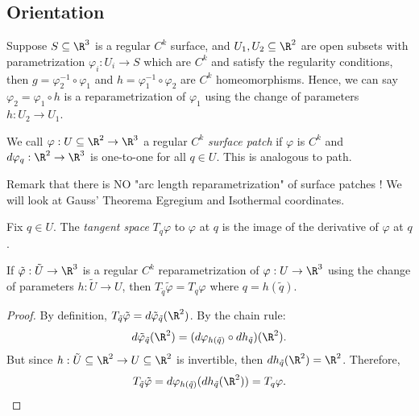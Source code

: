 \subsection{Orientation}

\begin{proposition}
    Suppose $S \subseteq \R^3$ is a regular $C^k$ surface, and $U_1, U_2 \subseteq \R^2$ are open subsets with parametrization $\varphi_i : U_i \to S$ which are $C^k$ and satisfy the regularity conditions, then $g = \varphi_2^{-1} \circ \varphi_1$ and $h = \varphi_1^{-1} \circ \varphi_2$ are $C^k$ homeomorphisms. Hence, we can say $\varphi_2 = \varphi_1 \circ h$ is a reparametrization of $\varphi_1$ using the change of parameters $h : U_2 \to U_1$.
\end{proposition}

\begin{definition}
    We call $\varphi : U \subseteq \R^2 \to \R^3$ a regular $C^k$ \textit{surface patch} if $\varphi$ is $C^k$ and $d\varphi_q : \R^2 \to \R^3$ is one-to-one for all $q \in U$. This is analogous to path.
\end{definition}

Remark that there is NO "arc length reparametrization" of surface patches ! We will look at Gauss' Theorema Egregium and Isothermal coordinates.

\begin{definition}
    Fix $q \in U$. The \textit{tangent space} $T_q\varphi$ to $\varphi$ at $q$ is the image of the derivative of $\varphi$ at $q$.
\end{definition}

\begin{proposition}
    If $\tilde{\varphi} : \tilde{U} \to \R^3$ is a regular $C^k$ reparametrization of $\varphi : U \to \R^3$ using the change of parameters $h : \tilde{U} \to U$, then $T_{\tilde{q}}\tilde{\varphi} = T_q \varphi$ where $q = h(\tilde{q})$.
\end{proposition}

\begin{proof}
    By definition, $T_{\tilde{q}}\tilde{\varphi} = d \tilde{\varphi}_{\tilde{q}}(\R^2)$. By the chain rule:
    $$d \tilde{\varphi}_{\tilde{q}}(\R^2) = (d \varphi_{h(\tilde{q})} \circ d h_{\tilde{q}})(\R^2).$$
    But since $h: \tilde{U} \subseteq \R^2 \to U \subseteq \R^2$ is invertible, then $dh_{\tilde{q}}(\R^2) = \R^2$. Therefore, 
    $$T_{\tilde{q}}\tilde{\varphi} = d \varphi_{h(\tilde{q})}(d h_{\tilde{q}}(\R^2)) = T_q \varphi .$$
\end{proof}


